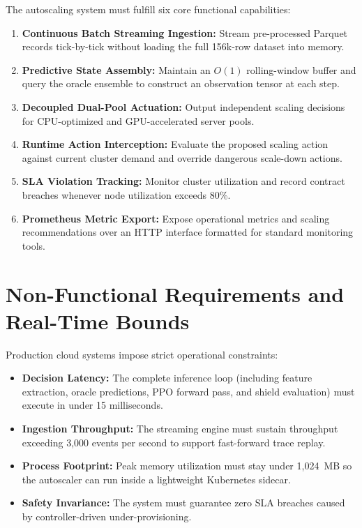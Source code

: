 \documentclass[12pt]{report}
\begin{document}
The autoscaling system must fulfill six core functional capabilities:
\begin{enumerate}[label=\textbf{FR-\arabic*.}]
\item \textbf{Continuous Batch Streaming Ingestion:} Stream pre-processed Parquet records tick-by-tick without loading the full 156k-row dataset into memory.
\item \textbf{Predictive State Assembly:} Maintain an $O(1)$ rolling-window buffer and query the oracle ensemble to construct an observation tensor at each step.
\item \textbf{Decoupled Dual-Pool Actuation:} Output independent scaling decisions for CPU-optimized and GPU-accelerated server pools.
\item \textbf{Runtime Action Interception:} Evaluate the proposed scaling action against current cluster demand and override dangerous scale-down actions.
\item \textbf{SLA Violation Tracking:} Monitor cluster utilization and record contract breaches whenever node utilization exceeds 80\%.
\item \textbf{Prometheus Metric Export:} Expose operational metrics and scaling recommendations over an HTTP interface formatted for standard monitoring tools.
\end{enumerate}

\section{Non-Functional Requirements and Real-Time Bounds}

Production cloud systems impose strict operational constraints:
\begin{itemize}
\item \textbf{Decision Latency:} The complete inference loop (including feature extraction, oracle predictions, PPO forward pass, and shield evaluation) must execute in under 15 milliseconds.
\item \textbf{Ingestion Throughput:} The streaming engine must sustain throughput exceeding 3,000 events per second to support fast-forward trace replay.
\item \textbf{Process Footprint:} Peak memory utilization must stay under 1,024~MB so the autoscaler can run inside a lightweight Kubernetes sidecar.
\item \textbf{Safety Invariance:} The system must guarantee zero SLA breaches caused by controller-driven under-provisioning.
\end{itemize}
\end{document}
